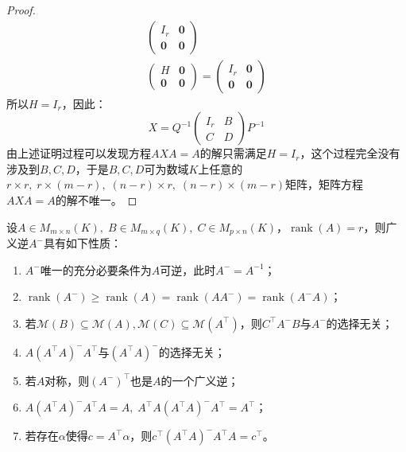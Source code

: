 \begin{proof}
\begin{gather*}
\begin{pmatrix}
			I_r & \mathbf{0} \\
			\mathbf{0} & \mathbf{0}
		\end{pmatrix} \\
		\begin{pmatrix}
			H & \mathbf{0} \\
			\mathbf{0} & \mathbf{0}
		\end{pmatrix}
		=
		\begin{pmatrix}
			I_r & \mathbf{0} \\
			\mathbf{0} & \mathbf{0}
		\end{pmatrix}
	\end{gather*}
	所以$H=I_r$，因此：
	\begin{equation*}
		X=Q^{-1}
		\begin{pmatrix}
			I_r & B \\
			C & D
		\end{pmatrix}
		P^{-1}
	\end{equation*}
	由上述证明过程可以发现方程$AXA=A$的解只需满足$H=I_r$，这个过程完全没有涉及到$B,C,D$，于是$B,C,D$可为数域$K$上任意的$r\times r,\;r\times (m-r),\;(n-r)\times r,\;(n-r)\times(m-r)$矩阵，矩阵方程$AXA=A$的解不唯一。
\end{proof}
\begin{property}\label{prop:A-}
	设$A\in M_{m\times n}(K),\;B\in M_{m\times q}(K),\;C\in M_{p\times n}(K)$，$\operatorname{rank}(A)=r$，则广义逆$A^-$具有如下性质：
	\begin{enumerate}
		\item $A^-$唯一的充分必要条件为$A$可逆，此时$A^-=A^{-1}$；
		\item $\operatorname{rank}(A^-)\geqslant\operatorname{rank}(A)=\operatorname{rank}(AA^-)=\operatorname{rank}(A^-A)$；
		\item 若$\mathcal{M}(B)\subseteq\mathcal{M}(A),\mathcal{M}(C)\subseteq\mathcal{M}(A^{\top})$，则$C^{\top}A^-B$与$A^-$的选择无关；
		\item $A(A^{\top}A)^-A^{\top}$与$(A^{\top}A)^-$的选择无关；
		\item 若$A$对称，则$(A^-)^{\top}$也是$A$的一个广义逆；
		\item $A(A^{\top}A)^-A^{\top}A=A,\;A^{\top}A(A^{\top}A)^-A^{\top}=A^{\top}$；
		\item 若存在$\alpha$使得$c=A^{\top}\alpha$，则$c^{\top}(A^{\top}A)^-A^{\top}A=c^{\top}$。
	\end{enumerate}
\end{property}
